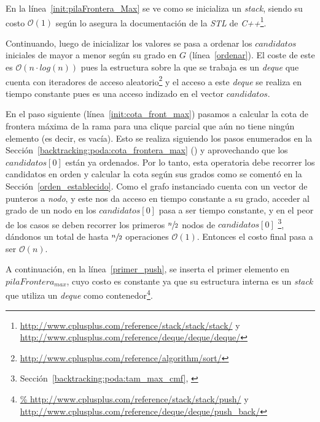 \par En la l\'inea~\ref{init:pilaFrontera_Max} se ve como se inicializa un \emph{stack},
    siendo su costo $\mathcal O(1)$ seg\'un lo asegura la documentaci\'on de la \emph{STL}
    de \emph{C++}\footnote{\url{http://www.cplusplus.com/reference/stack/stack/stack/} y
    \url{http://www.cplusplus.com/reference/deque/deque/deque/}}.

\par Continuando, luego de inicializar los valores se pasa a ordenar los $candidatos$
    iniciales de mayor a menor seg\'un su grado en $G$ (l\'inea~\ref{ordenar}).
    El coste de este es $\mathcal O(n \cdot log(n))$ pues la estructura sobre la que
    se trabaja es un \emph{deque} que cuenta con iteradores de acceso aleatorio\footnote{%
    \url{http://www.cplusplus.com/reference/algorithm/sort/}} y el acceso a este
    \emph{deque} se realiza en tiempo constante pues es una acceso indizado en
    el vector $candidatos$.

\par En el paso siguiente (l\'inea~\ref{init:cota_front_max}) pasamos a calcular
    la cota de frontera m\'axima de la rama para una clique parcial que a\'un
    no tiene ning\'un elemento (es decir, es vac\'ia). Esto se realiza siguiendo
    los pasos enumerados en la Secci\'on~\ref{backtracking:poda:cota_frontera_max}
    (\emph{}) y aprovechando que los
    $candidatos[0]$ est\'an ya ordenados. Por lo tanto, esta operatoria
    debe recorrer los candidatos en orden y calcular la cota seg\'un sus
    grados como se coment\'o en la Secci\'on~\ref{orden_establecido}. Como
    el grafo instanciado cuenta con un vector de punteros a \emph{nodo}, y este
    nos da acceso en tiempo constante a su grado, acceder al grado de un nodo
    en los $candidatos[0]$ pasa a ser tiempo constante, y en el peor de los
    casos se deben recorrer los primeros $\sfrac{n}{2}$ nodos de $candidatos[0]$%
    \footnote{Secci\'on~\ref{backtracking:poda:tam_max_cmf}, \emph{}},
    d\'andonos un total de hasta $\sfrac{n}{2}$ operaciones $\mathcal O(1)$. Entonces
    el costo final pasa a ser $\mathcal O(n)$.

\par A continuaci\'on, en la l\'inea~\ref{primer_push}, se inserta el primer elemento
    en $pilaFrontera_{max}$, cuyo costo es constante ya que su estructura interna
    es un \emph{stack} que utiliza un \emph{deque} como contenedor\footnote{\url{%
    http://www.cplusplus.com/reference/stack/stack/push/} y \url{http://www.cplusplus.com/reference/deque/deque/push_back/}}.

